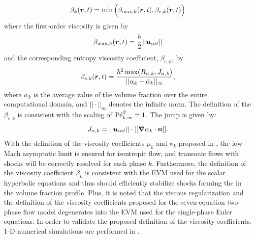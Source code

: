%
\begin{equation}\label{eq:first-order-beta-sct4-sem}
\beta_k(\boldsymbol r,t) = \min \Big (\beta_{\max,k}(\boldsymbol r,t), \beta_{e,k} (\boldsymbol r,t) \Big ) 
\end{equation}
%
where the first-order viscosity is given by
\begin{equation}\label{eq:first-order-beta-max-sct4-sem}
\beta_{\max,k} (\boldsymbol r,t) = \frac{h}{2} ||\boldsymbol u_{int}||
\end{equation}
%
and the corresponding entropy viscosity coefficient, $\beta_{e,k}$, by 
%
\begin{equation}
\beta_{e,k}(\boldsymbol r,t) = \frac{h^2 \max(R_{\alpha,k}, J_{\alpha,k})}{|| \alpha_k - \bar{\alpha}_k ||_\infty},
\end{equation}
where $\bar{\alpha}_k$ is the average value of the volume fraction over the entire computational domain, and $|| \cdot ||_\infty$ denotes the infinite norm. The definition of the $\beta_{e,k}$ is consistent with the scaling of $\textrm{P\'e}^\beta_{k,\infty} = 1$. The jump is given by:
%
\begin{equation}
J_{\alpha,k} = || \boldsymbol u_{int} || \cdot [[ \boldsymbol{\nabla} \alpha_k \cdot \boldsymbol n ]]. 
\end{equation}
With the definition of the viscosity coefficients $\mu_k$ and $\kappa_k$ proposed in , the low-Mach asymptotic limit is ensured for isentropic flow, and transonic flows with shocks will be correctly resolved for each phase $k$. Furthermore, the definition of the viscosity coefficient $\beta_k$ is consistent with the EVM used for the scalar hyperbolic equations and thus should efficiently stabilize shocks forming the in the volume fraction profile. Plus, it is noted that the viscous regularization and the definition of the viscosity coefficients proposed for the seven-equation two-phase flow model degenerates into the EVM used for the single-phase Euler equations. In order to validate the proposed definition of the viscosity coefficients, 1-D numerical simulations are performed in .
%
